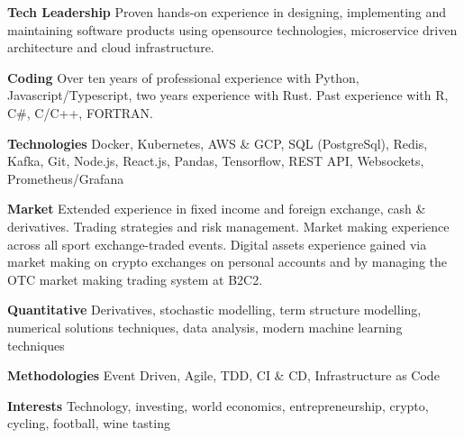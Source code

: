 {\bf Tech Leadership} Proven hands-on experience in designing, implementing and maintaining software products
using opensource technologies, microservice driven architecture and cloud infrastructure.

    {\bf Coding} Over ten years of professional experience with Python, Javascript/Typescript, two years experience with Rust.
Past experience with R, C\#, C/C++, FORTRAN.

    {\bf Technologies} Docker, Kubernetes, AWS \& GCP, SQL (PostgreSql), Redis, Kafka, Git, Node.js, React.js, Pandas,
Tensorflow, REST API, Websockets, Prometheus/Grafana

{\bf Market} Extended experience in fixed income and foreign exchange, cash \& derivatives.
Trading strategies and risk management.
Market making experience across all sport exchange-traded events.
Digital assets experience gained via market making on crypto exchanges on personal accounts and by managing the OTC market making trading system at B2C2.

    {\bf Quantitative} Derivatives, stochastic modelling, term structure modelling, numerical solutions techniques,
data analysis, modern machine learning techniques

    {\bf Methodologies} Event Driven, Agile, TDD, CI \& CD, Infrastructure as Code

    {\bf Interests} Technology, investing, world economics, entrepreneurship, crypto, cycling, football, wine tasting
